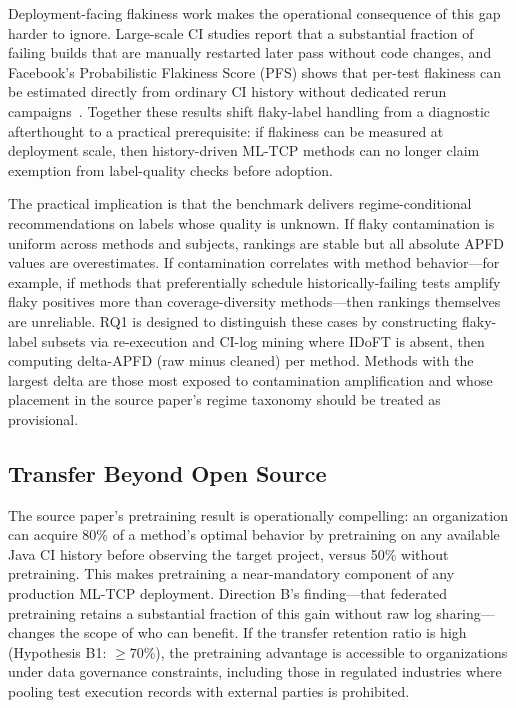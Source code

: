 \documentclass[10pt,conference]{IEEEtran}
\begin{document}
Deployment-facing flakiness work makes the operational consequence of this gap harder to ignore. Large-scale CI studies report that a substantial fraction of failing builds that are manually restarted later pass without code changes, and Facebook's Probabilistic Flakiness Score (PFS) shows that per-test flakiness can be estimated directly from ordinary CI history without dedicated rerun campaigns~\cite{pfs}. Together these results shift flaky-label handling from a diagnostic afterthought to a practical prerequisite: if flakiness can be measured at deployment scale, then history-driven ML-TCP methods can no longer claim exemption from label-quality checks before adoption.

The practical implication is that the benchmark delivers regime-conditional recommendations on labels whose quality is unknown. If flaky contamination is uniform across methods and subjects, rankings are stable but all absolute APFD values are overestimates. If contamination correlates with method behavior---for example, if methods that preferentially schedule historically-failing tests amplify flaky positives more than coverage-diversity methods---then rankings themselves are unreliable. RQ1 is designed to distinguish these cases by constructing flaky-label subsets via re-execution and CI-log mining where IDoFT is absent, then computing delta-APFD (raw minus cleaned) per method. Methods with the largest delta are those most exposed to contamination amplification and whose placement in the source paper's regime taxonomy should be treated as provisional.

\subsection{Transfer Beyond Open Source}

The source paper's pretraining result is operationally compelling: an organization can acquire 80\% of a method's optimal behavior by pretraining on any available Java CI history before observing the target project, versus 50\% without pretraining. This makes pretraining a near-mandatory component of any production ML-TCP deployment. Direction B's finding---that federated pretraining retains a substantial fraction of this gain without raw log sharing---changes the scope of who can benefit. If the transfer retention ratio is high (Hypothesis B1: $\geq 70\%$), the pretraining advantage is accessible to organizations under data governance constraints, including those in regulated industries where pooling test execution records with external parties is prohibited.
\end{document}
